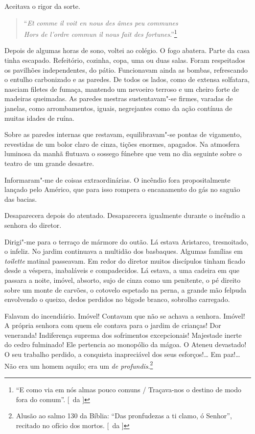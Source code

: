 Aceitava o rigor da sorte. 

\begin{verse}
\hspace{-2em}``\textit{Et comme il voit en nous des âmes peu communes}\\
\hspace{-2em}\textit{Hors de l'ordre commun il nous fait des fortunes}.''\footnote{ ``E como 
via em nós almas pouco comuns / Traçava-nos o destino de modo fora do comum''. [~da ]}
\end{verse}

\noindent\dotfill

Depois de algumas horas de sono, voltei ao colégio. O fogo abatera. Parte da casa
tinha escapado. Refeitório, cozinha, copa, uma ou duas salas. Foram
respeitados os pavilhões independentes, do pátio. Funcionavam ainda as
bombas, refrescando o entulho carbonizado e as paredes. De todos os
lados, como de extensa solfatara, nasciam filetes de fumaça, mantendo
um nevoeiro terroso e um cheiro forte de madeiras queimadas. As paredes
mestras sustentavam"-se firmes, varadas de janelas, como
arrombamentos, iguais, negrejantes como da ação contínua de muitas
idades de ruína. 


Sobre as paredes internas que restavam,
equilibravam"-se pontas de vigamento, revestidas de um bolor claro de
cinza, tições enormes, apagados. Na atmosfera luminosa da manhã
flutuava o sossego fúnebre que vem no dia seguinte sobre o teatro de um
grande desastre. 

Informaram"-me de coisas extraordinárias. O incêndio
fora propositalmente lançado pelo Américo, que para isso rompera o
encanamento do gás no saguão das bacias. 

Desaparecera depois do
atentado. Desaparecera igualmente durante o incêndio a senhora do
diretor. 

Dirigi"-me para o terraço de mármore do outão. Lá estava
Aristarco, tresnoitado, o infeliz. No jardim continuava a multidão dos
basbaques. Algumas famílias em \textit{toilette} matinal passeavam. Em redor do
diretor muitos discípulos tinham ficado desde a véspera, inabaláveis e
compadecidos. Lá estava, a uma cadeira em que passara a noite, imóvel,
absorto, sujo de cinza como um penitente, o pé direito sobre um monte
de carvões, o cotovelo espetado na perna, a grande mão felpuda
envolvendo o queixo, dedos perdidos no bigode branco, sobrolho
carregado. 

Falavam do incendiário. Imóvel! Contavam que não se achava a
senhora. Imóvel! A própria senhora com quem ele contava para o jardim
de crianças! Dor veneranda! Indiferença suprema dos sofrimentos
excepcionais! Majestade inerte do cedro fulminado! Ele pertencia ao
monopólio da mágoa. O Ateneu devastado! O seu trabalho perdido, a
conquista inapreciável dos seus esforços!\ldots{} Em paz!\ldots{} Não era um
homem aquilo; era um \textit{de profundis}.\footnote{ Alusão ao salmo 130 da Bíblia:
``Das pronfudezas a ti clamo, ó Senhor'', recitado no ofício dos mortos. [~da ]} 

